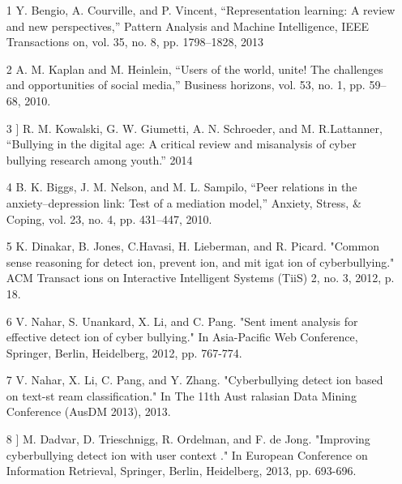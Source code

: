 \documentclass[oneside,a4paper,12pt]{report}
\begin{document}


\begin{itemize}
   
\item [1] Y. Bengio, A. Courville, and P. Vincent, “Representation learning: A review and new perspectives,” Pattern Analysis and Machine Intelligence, IEEE Transactions on, vol. 35, no. 8, pp. 1798–1828, 2013 \\

\item [2]A. M. Kaplan and M. Heinlein, “Users of the world, unite! The challenges and opportunities of social media,” Business horizons, vol. 53, no. 1, pp. 59–68, 2010. \\

\item [3] ] R. M. Kowalski, G. W. Giumetti, A. N. Schroeder, and M. R.Lattanner, “Bullying in the digital age: A critical review and misanalysis of cyber bullying research among youth.” 2014\\

\item [4]B. K. Biggs, J. M. Nelson, and M. L. Sampilo, “Peer relations in the anxiety–depression link: Test of a mediation model,” Anxiety, Stress, & Coping, vol. 23, no. 4, pp. 431–447, 2010. \\

\item [5] K. Dinakar, B. Jones, C.Havasi, H. Lieberman, and R. Picard. "Common
sense reasoning for detect ion, prevent ion, and mit igat ion of
cyberbullying." ACM Transact ions on Interactive Intelligent Systems
(TiiS) 2, no. 3, 2012, p. 18. \\


\item [6]V. Nahar, S. Unankard, X. Li, and C. Pang. "Sent iment analysis for
effective detect ion of cyber bullying." In Asia-Pacific Web Conference,
Springer, Berlin, Heidelberg, 2012, pp. 767-774.\\

\item [7] V. Nahar, X. Li, C. Pang, and Y. Zhang. "Cyberbullying detect ion based
on text-st ream classification." In The 11th Aust ralasian Data Mining
Conference (AusDM 2013), 2013.\\

\item [8] ] M. Dadvar, D. Trieschnigg, R. Ordelman, and F. de Jong. "Improving
cyberbullying detect ion with user context ." In European Conference on
Information Retrieval, Springer, Berlin, Heidelberg, 2013, pp. 693-696.\\


\end{itemize}
\end{document}
